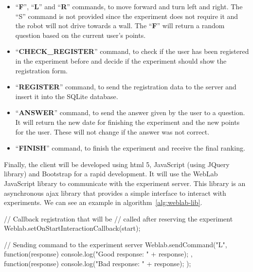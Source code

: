 \begin{itemize}
	\item ``\textbf{F}'', ``\textbf{L}'' and ``\textbf{R}'' commands, to move forward and turn left
	and right. The ``S'' command is not provided since the experiment does not require it and the
	robot will not drive towards a wall. The ``\textbf{F}'' will return a random question based on
	the current user's points.

	\item ``\textbf{CHECK\_REGISTER}'' command, to check if the user has been registered in the
	experiment before and decide if the experiment should show the registration form.

	\item ``\textbf{REGISTER}'' command, to send the registration data to the server and insert it
	into the SQLite database.

	\item ``\textbf{ANSWER}'' command, to send the answer given by the user to a question. It will
	return the new date for finishing the experiment and the new points for the user. These will not
	change if the answer was not correct.

	\item ``\textbf{FINISH}'' command, to finish the experiment and receive the final ranking.
\end{itemize}

Finally, the client will be developed using \acrshort{html} 5, JavaScript (using JQuery library) and
Bootstrap for a rapid development. It will use the WebLab JavaScript library to communicate with the
experiment server. This library is an asynchronous \acrshort{ajax} library that provides a simple
interface to interact with experiments. We can see an example in algorithm~\ref{alg:weblab-lib}.

\begin{center}
\begin{minipage}{.9\textwidth}
\singlespace
\begin{pyglist}[language=javascript, caption={WebLab JavaScript library example.},
	label={alg:weblab-lib}, listingname={Algorithm}, numbers=left]
// Callback registration that will be
// called after reserving the experiment
Weblab.setOnStartInteractionCallback(start);

// Sending command to the experiment server
Weblab.sendCommand("L", function(response) {
    console.log("Good response: " + response);
}, function(response) {
    console.log("Bad response: " + response);
});
\end{pyglist}
\end{minipage}
\end{center}

